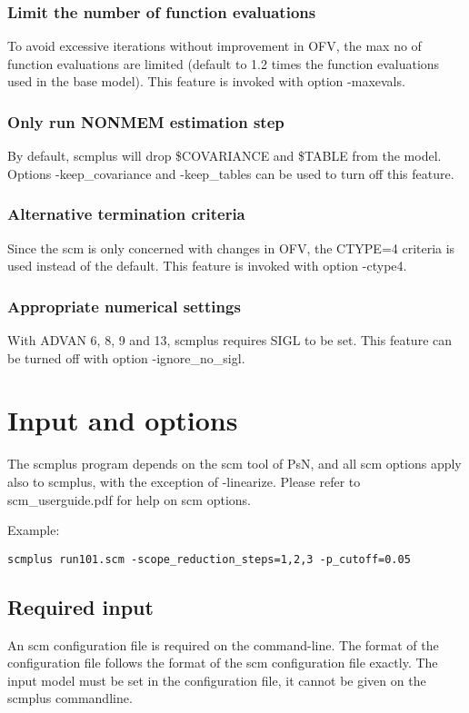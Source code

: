 \documentclass[hideglossary,notoc,hidelof,hidelot,hideTheSignaturePage,hideLinkCurrent,hideloa,pdfLatex,noClient,notitle,hideConfidential]{PMXstyle-20190820}
\begin{document}
\subsubsection{Limit the number of function evaluations}
To avoid excessive
iterations without improvement in OFV, the max no of function
evaluations are limited (default to 1.2 times the function evaluations
used in the base model). This feature is invoked with option -maxevals.
\subsubsection{Only run NONMEM estimation step}
By default, scmplus will drop \$COVARIANCE and \$TABLE from the model.
Options -keep\_covariance and -keep\_tables can be used to turn off this feature.
\subsubsection{Alternative termination criteria}
Since the scm is only concerned with
changes in OFV, the CTYPE=4 criteria is used instead of the default.
This feature is invoked with option -ctype4.
\subsubsection{Appropriate numerical settings}
With ADVAN 6, 8, 9 and 13, scmplus requires SIGL to be set.
This feature can be turned off with option -ignore\_no\_sigl.


\section{Input and options}

The scmplus program depends on the scm tool of PsN, and all scm options apply also to scmplus,
with the exception of -linearize.
Please refer to scm\_userguide.pdf for help on scm options.

Example:
\begin{verbatim}
scmplus run101.scm -scope_reduction_steps=1,2,3 -p_cutoff=0.05
\end{verbatim}

\subsection{Required input}
An scm configuration file is required on the command-line. The format of the configuration file follows the format of 
the scm configuration file exactly. 
The input model must be set in the configuration file, it cannot be given on the scmplus commandline. 
\end{document}
